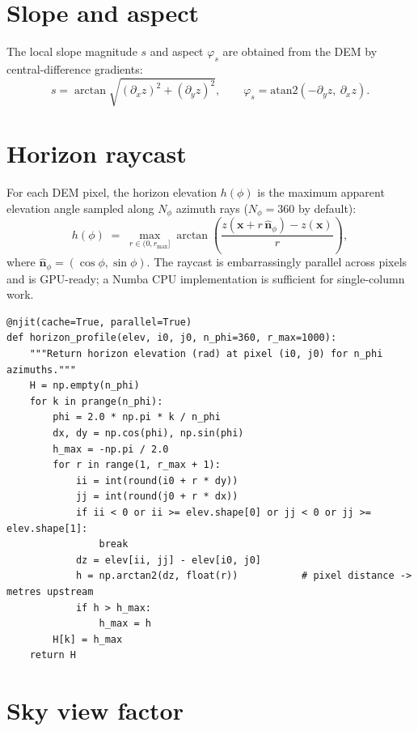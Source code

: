 \section{Slope and aspect}

The local slope magnitude $s$ and aspect $\varphi_s$ are obtained from
the DEM by central-difference gradients:
\begin{equation}
  s = \arctan\!\sqrt{(\partial_x z)^2 + (\partial_y z)^2},
  \qquad
  \varphi_s = \mathrm{atan2}(-\partial_y z,\ \partial_x z).
  \label{eq:slope_aspect}
\end{equation}

\section{Horizon raycast}

For each DEM pixel, the horizon elevation $h(\phi)$ is the maximum
apparent elevation angle sampled along $N_\phi$ azimuth rays
($N_\phi = 360$ by default):
\begin{equation}
  h(\phi) \;=\; \max_{r \in (0, r_{\max}]}
  \arctan\!\left(\frac{z(\mathbf{x} + r\,\hat{\bm{n}}_\phi) - z(\mathbf{x})}{r}\right),
  \label{eq:horizon}
\end{equation}
where $\hat{\bm{n}}_\phi = (\cos\phi, \sin\phi)$.  The raycast is
embarrassingly parallel across pixels and is GPU-ready; a Numba
CPU implementation is sufficient for single-column work.

\begin{lstlisting}[caption={Horizon raycast kernel (sketch) from \code{lunar/horizon.py}.},label={lst:horizon}]
@njit(cache=True, parallel=True)
def horizon_profile(elev, i0, j0, n_phi=360, r_max=1000):
    """Return horizon elevation (rad) at pixel (i0, j0) for n_phi azimuths."""
    H = np.empty(n_phi)
    for k in prange(n_phi):
        phi = 2.0 * np.pi * k / n_phi
        dx, dy = np.cos(phi), np.sin(phi)
        h_max = -np.pi / 2.0
        for r in range(1, r_max + 1):
            ii = int(round(i0 + r * dy))
            jj = int(round(j0 + r * dx))
            if ii < 0 or ii >= elev.shape[0] or jj < 0 or jj >= elev.shape[1]:
                break
            dz = elev[ii, jj] - elev[i0, j0]
            h = np.arctan2(dz, float(r))           # pixel distance -> metres upstream
            if h > h_max:
                h_max = h
        H[k] = h_max
    return H
\end{lstlisting}

\section{Sky view factor}

